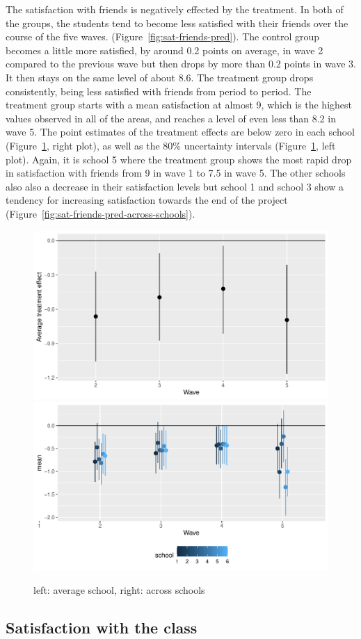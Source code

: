 \documentclass[a4, 12pt]{article}
\begin{document}
\label{sec:results-friends}
The satisfaction with friends is negatively effected by the treatment. In both of the groups, the students tend to become less satisfied with their friends over the course of the five waves. (Figure~\ref{fig:sat-friends-pred}). The control group becomes a little more satisfied, by around 0.2 points on average, in wave 2 compared to the previous wave but then drops by more than 0.2 points in wave 3. It then stays on the same level of about 8.6. The treatment group drops consistently, being less satisfied with friends from period to period. The treatment group starts with a mean satisfaction at almost 9, which is the highest values observed in all of the areas, and reaches a level of even less than 8.2 in wave 5. The point estimates of the treatment effects are below zero in each school (Figure~\ref{fig:friends}, right plot), as well as the 80\% uncertainty intervals (Figure~\ref{fig:friends}, left plot). Again, it is school 5 where the treatment group shows the most rapid drop in satisfaction with friends from 9 in wave 1 to 7.5 in wave 5. The other schools also also a decrease in their satisfaction levels but school 1 and school 3 show a tendency for increasing satisfaction towards the end of the project (Figure~\ref{fig:sat-friends-pred-across-schools}).

\begin{figure}[H]
\includegraphics[width=0.5\linewidth,]{../figures/sat_friends_teff} \includegraphics[width=0.5\linewidth,]{../figures/sat_friends_teff_across_schools} \caption{left: average school, right: across schools}\label{fig:friends}
\end{figure}

\hypertarget{satisfaction-with-the-class}{%
\subsection{Satisfaction with the class}\label{satisfaction-with-the-class}}
\end{document}
